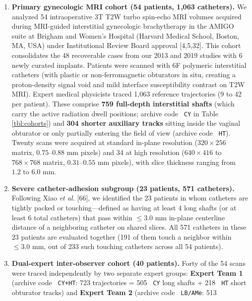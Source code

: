 \documentclass[
  11pt,
]{article}
\providecommand{\tightlist}{%
  \setlength{\itemsep}{0pt}\setlength{\parskip}{0pt}}
\let\nforigtexttt\texttt
\renewcommand{\texttt}[1]{\nforigtexttt{\XeTeXinterchartokenstate=1 #1}}
\begin{document}
\begin{enumerate}
\def\labelenumi{\arabic{enumi}.}
\tightlist
\item
  \textbf{Primary gynecologic MRI cohort (54 patients, 1,063
  catheters).} We analyzed 54 intraoperative 3T T2W turbo spin-echo MRI
  volumes acquired during MRI-guided interstitial gynecologic
  brachytherapy in the AMIGO suite at Brigham and Women's Hospital
  (Harvard Medical School, Boston, MA, USA) under Institutional Review
  Board approval {[}4,5,32{]}. This cohort consolidates the 48
  recoverable cases from our 2013 and 2019 studies with 6 newly curated
  implants. Patients were scanned with 6F polymeric interstitial
  catheters (with plastic or non-ferromagnetic obturators in situ,
  creating a proton-density signal void and mild interface
  susceptibility contrast on T2W MRI). Expert medical physicists traced
  1,063 reference trajectories (9 to 42 per patient). These comprise
  \textbf{759 full-depth interstitial shafts} (which carry the active
  radiation dwell positions; archive code \texttt{CY} in Table
  \ref{tbl:cohorts}) and \textbf{304 shorter auxiliary tracks} sitting
  inside the vaginal obturator or only partially entering the field of
  view (archive code \texttt{HT}). Twenty scans were acquired at
  standard in-plane resolution (\(320 \times 256\) matrix,
  \(0.75\text{--}0.88\text{ mm}\) pixels) and 34 at high resolution
  (\(640 \times 416\) to \(768 \times 768\) matrix,
  \(0.31\text{--}0.55\text{ mm}\) pixels), with slice thickness ranging
  from \(1.2\text{ to }6.0\text{ mm}\).
\item
  \textbf{Severe catheter-adhesion subgroup (23 patients, 571
  catheters).} Following Xiao \emph{et al.} {[}66{]}, we identified the
  23 patients in whom catheters are tightly packed or touching---defined
  as having at least 4 long shafts (or at least 6 total catheters) that
  pass within \(\le 3.0\text{ mm}\) in-plane centerline distance of a
  neighboring catheter on shared slices. All 571 catheters in these 23
  patients are evaluated together (191 of them touch a neighbor within
  \(\le 3.0\text{ mm}\), out of 233 such touching catheters across all
  54 patients).
\item
  \textbf{Dual-expert inter-observer cohort (40 patients).} Forty of the
  54 scans were traced independently by two separate expert groups:
  \textbf{Expert Team 1} (archive code \texttt{CY+HT}: 723 trajectories
  = 505 \texttt{CY} long shafts + 218 \texttt{HT} short obturator
  tracks) and \textbf{Expert Team 2} (archive code \texttt{LB/AMe}: 513

\end{enumerate}
\end{document}
